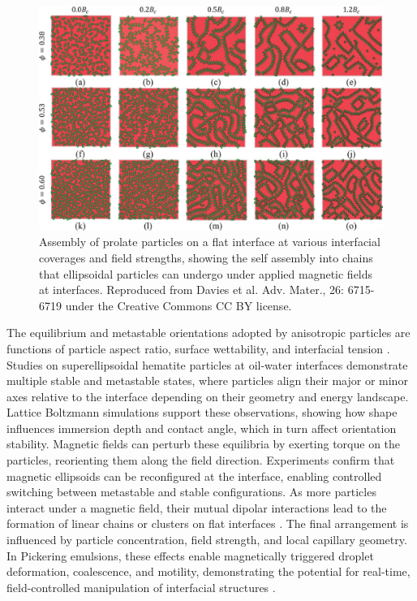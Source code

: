\begin{figure}
    \centering
    \includegraphics[scale = 0.4]{figures/introduction/anisotropic_particles_assembly.jpg}
    \caption{Assembly of prolate particles on a flat interface at various interfacial coverages and field strengths,
             showing the self assembly into chains that ellipsoidal particles can undergo under applied magnetic fields at
             interfaces. \cite{davies_assembling_2014} Reproduced from Davies et al. Adv. Mater., 26: 6715-6719 under the 
             Creative Commons CC BY license.}
    \label{fig:anisotropic_assembly}
\end{figure}

The equilibrium and metastable orientations adopted by anisotropic particles are functions of particle aspect ratio, surface wettability, and interfacial tension 
\cite{morgan_understanding_2013, newton_influence_2014}. Studies on superellipsoidal hematite particles at oil-water interfaces demonstrate multiple stable and metastable states, where particles align 
their major or minor axes relative to the interface depending on their geometry and energy landscape. Lattice Boltzmann simulations support these observations, showing how shape influences immersion 
depth and contact angle, which in turn affect orientation stability. Magnetic fields can perturb these equilibria by exerting torque on the particles, reorienting them along the field direction. 
Experiments confirm that magnetic ellipsoids can be reconfigured at the interface, enabling controlled switching between metastable and stable configurations.
As more particles interact under a magnetic field, their mutual dipolar interactions lead to the formation of linear chains or clusters on flat interfaces \cite{davies_assembling_2014, newton_capillary_2018}. 
The final arrangement is influenced by particle concentration, field strength, and local capillary geometry. In Pickering emulsions, these effects enable magnetically triggered droplet deformation, coalescence, 
and motility, demonstrating the potential for real-time, field-controlled manipulation of interfacial structures \cite{melle_pickering_2005, tham_magnetophoresis_2021}.

